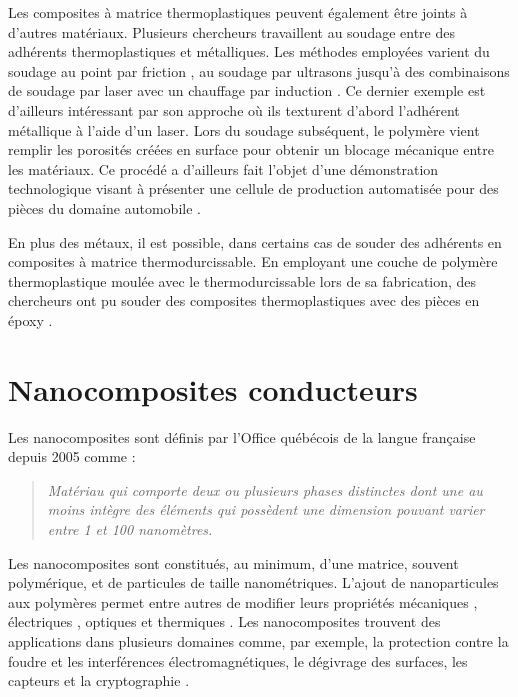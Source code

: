 Les composites à matrice thermoplastiques peuvent également être joints à d'autres matériaux. 
Plusieurs chercheurs travaillent au soudage entre des adhérents thermoplastiques et métalliques. 
Les méthodes employées varient du soudage au point par friction \cite{Goushegir2016}, au soudage par ultrasons \cite{Balle2009,Kruger2004} jusqu'à des combinaisons de soudage par laser avec un chauffage par induction \cite{Weidmann2018}. 
Ce dernier exemple est d'ailleurs intéressant par son approche où ils texturent d'abord l'adhérent métallique à l'aide d'un laser. 
Lors du soudage subséquent, le polymère vient remplir les porosités créées en surface pour obtenir un blocage mécanique entre les matériaux. 
Ce procédé a d'ailleurs fait l'objet d'une démonstration technologique visant à présenter une cellule de production automatisée pour des pièces du domaine automobile \cite{Gardiner2019a}. 

En plus des métaux, il est possible, dans certains cas de souder des adhérents en composites à matrice thermodurcissable. 
En employant une couche de polymère thermoplastique moulée avec le thermodurcissable lors de sa fabrication, des chercheurs ont pu souder des composites thermoplastiques avec des pièces en époxy \cite{Lionetto2018a,FernandezVillegas2015}.

\section{Nanocomposites conducteurs}

Les nanocomposites sont définis par l'Office québécois de la langue française depuis 2005 comme : 

\begin{quote}
	\textit{Matériau qui comporte deux ou plusieurs phases distinctes dont une au moins intègre des éléments qui possèdent une dimension pouvant varier entre 1 et 100 nanomètres.}
\end{quote}

Les nanocomposites sont constitués, au minimum, d'une matrice, souvent polymérique, et de particules de taille nanométriques. 
L'ajout de nanoparticules aux polymères permet entre autres de modifier leurs propriétés mécaniques \cite{Thostenson2002a}, électriques \cite{Zheng2003a}, optiques \cite{Hu2014} et thermiques \cite{Diez-Pascual2009, Al-Saleh2009c}. 
Les nanocomposites trouvent des applications dans plusieurs domaines comme, par exemple, la protection contre la foudre et les interférences électromagnétiques, le dégivrage des surfaces, les capteurs et la cryptographie \cite{Andrews2001, Thostenson2001c, Mittal2014h, Gaztelumendi2017, Chu2014, Hu2016, Al-Saleh2009, Chopra2003}. 

